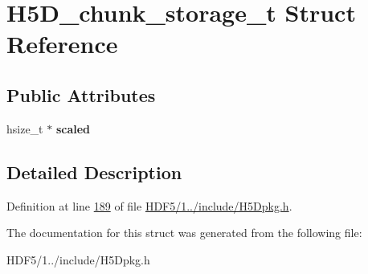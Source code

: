 \hypertarget{struct_h5_d__chunk__storage__t}{}\section{H5\+D\+\_\+chunk\+\_\+storage\+\_\+t Struct Reference}
\label{struct_h5_d__chunk__storage__t}
\subsection*{Public Attributes}
\begin{DoxyCompactItemize}
\item 
\mbox{\label{struct_h5_d__chunk__storage__t_a4d0a5e587240212f8d1e5d366ec46630}} 
hsize\+\_\+t $\ast$ {\bfseries scaled}
\end{DoxyCompactItemize}


\subsection{Detailed Description}


Definition at line \hyperlink{_h_d_f5_21_810_81_2include_2_h5_dpkg_8h_source_l00189}{189} of file \hyperlink{_h_d_f5_21_810_81_2include_2_h5_dpkg_8h_source}{H\+D\+F5/1../include/\+H5\+Dpkg.\+h}.



The documentation for this struct was generated from the following file\+:\begin{DoxyCompactItemize}
\item 
H\+D\+F5/1../include/\+H5\+Dpkg.\+h\end{DoxyCompactItemize}
